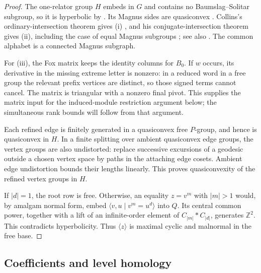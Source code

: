 \begin{proof}
The one-relator group \(H\) embeds in \(G\) and contains no
Baumslag--Solitar subgroup, so it is hyperbolic by
\cite[Theorem~1.1]{OpenAIHyperbolicity}. Its Magnus sides are
quasiconvex \cite[Theorem~4.7]{LintonHyperbolic2026}.
Collins's ordinary-intersection theorem gives (i)
\cite[Theorem~2]{Collins2004}, and his conjugate-intersection theorem
gives (ii), including the case of equal Magnus subgroups
\cite[Theorem~2]{Collins2008}; see also
\cite[Section~8.3]{OpenAIHyperbolicity}.
The common alphabet is a connected Magnus subgraph.

For (iii), the Fox matrix keeps the identity columns for \(B_0\).
If \(w\) occurs, its derivative in the missing extreme letter is
nonzero: in a reduced word in a free group the relevant prefix
vertices are distinct, so those signed terms cannot cancel.
The matrix is triangular with a nonzero final pivot.
This supplies the matrix input for the induced-module restriction
argument below; the simultaneous rank bounds will follow from that
argument.

Each refined edge is finitely generated in a quasiconvex free
\(P\)-group, and hence is quasiconvex in \(H\). In a finite splitting
over ambient quasiconvex edge groups, the vertex groups are also
undistorted: replace successive excursions of a geodesic outside
a chosen vertex space by paths in the attaching edge cosets.
Ambient edge undistortion bounds their lengths linearly. This proves
quasiconvexity of the refined vertex groups in \(H\).

If \(|d|=1\), the root row is free. Otherwise, an equality \(z=v^m\)
with \(|m|>1\) would, by amalgam normal form, embed
\(\langle v,u\mid v^m=u^d\rangle\) into \(Q\).
Its central common power, together with a lift of an infinite-order
element of \(C_{|m|}*C_{|d|}\), generates \(\mathbb Z^2\).
This contradicts hyperbolicity. Thus \(\langle z\rangle\) is maximal
cyclic and malnormal in the free base.
\end{proof}

\subsection{Coefficients and level homology}

